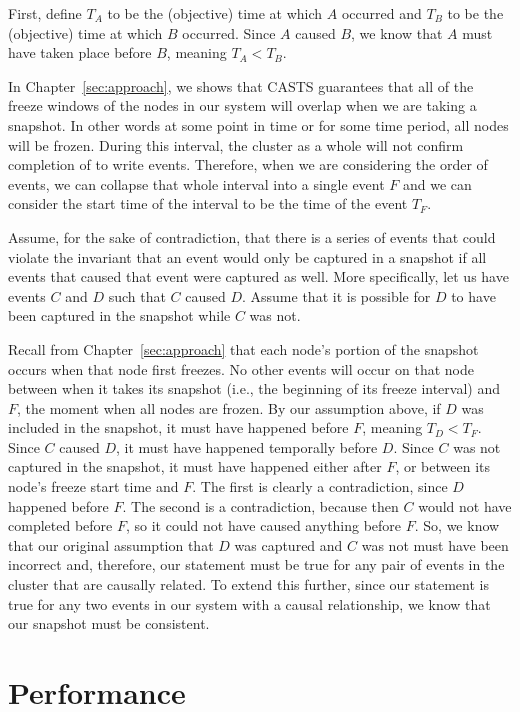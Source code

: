 First, define $T_A$ to be the (objective) time at which $A$ occurred
and $T_B$ to be the (objective) time at which $B$ occurred. Since $A$
caused $B$, we know that $A$ must have taken place before $B$, meaning
$T_A < T_B$.

In Chapter~\ref{sec:approach}, we shows that CASTS guarantees
that all of the freeze windows of the nodes in our system will overlap
when we are taking a snapshot. In other words at some point in time or
for some time period, all nodes will be frozen.  During this interval,
the cluster as a whole will not confirm completion of to write
events. Therefore, when we are considering the order of events, we can
collapse that whole interval into a single event $F$ and we can
consider the start time of the interval to be the time of the event
$T_F$.

Assume, for the sake of contradiction, that there is a series of
events that could violate the invariant that an event would only be
captured in a snapshot if all events that caused that event were
captured as well. More specifically, let us have events $C$ and $D$
such that $C$ caused $D$. Assume that it is possible for $D$ to have
been captured in the snapshot while $C$ was not.

Recall from Chapter~\ref{sec:approach} that each node's portion of the
snapshot occurs when that node first freezes. No other events will
occur on that node between when it takes its snapshot (i.e., the
beginning of its freeze interval) and $F$, the moment when all nodes
are frozen. By our assumption above, if $D$ was included in the
snapshot, it must have happened before $F$, meaning $T_D <T_F$. Since
$C$ caused $D$, it must have happened temporally before $D$.  Since
$C$ was not captured in the snapshot, it must have happened either
after $F$, or between its node's freeze start time and $F$. The first
is clearly a contradiction, since $D$ happened before $F$. The second
is a contradiction, because then $C$ would not have completed before
$F$, so it could not have caused anything before $F$. So, we know that
our original assumption that $D$ was captured and $C$ was not must
have been incorrect and, therefore, our statement must be true for any
pair of events in the cluster that are causally related. To extend
this further, since our statement is true for any two events in our
system with a causal relationship, we know that our snapshot must be
consistent.

\section{Performance}

